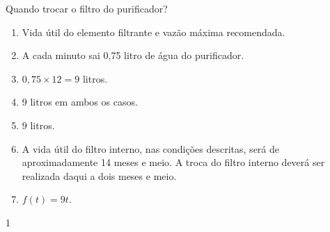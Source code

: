 \begin{answer}{Quando trocar o filtro do purificador?}
{
\begin{enumerate}
\item Vida útil do elemento filtrante e vazão máxima recomendada.
\item A cada minuto sai 0,75 litro de água do purificador.
\item $0,75\times12=9$ litros.
\item $9$ litros em ambos os casos.
\item $9$ litros.
\item A vida útil do filtro interno, nas condições descritas, será de aproximadamente 14 meses e meio. A troca do filtro interno deverá ser realizada daqui a dois meses e meio.
\item $f(t)=9t$.

\begin{figure}[H]
\centering


\end{figure}
\end{enumerate}
}{1}
\end{answer}

\label{\detokenize{AF107-3::doc}}\label{\detokenize{AF107-3:praticando}}

